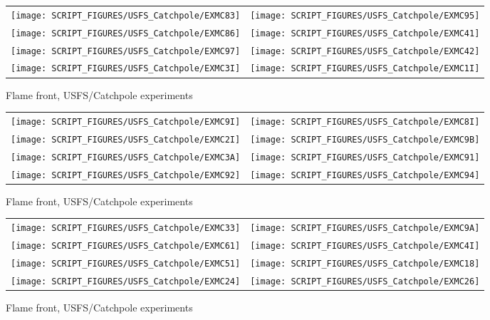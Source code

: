 \begin{figure}[p]
\begin{tabular*}{\textwidth}{l@{\extracolsep{\fill}}r}
\texttt{[image: SCRIPT\_FIGURES/USFS\_Catchpole/EXMC83]} &
\texttt{[image: SCRIPT\_FIGURES/USFS\_Catchpole/EXMC95]} \\
\texttt{[image: SCRIPT\_FIGURES/USFS\_Catchpole/EXMC86]} &
\texttt{[image: SCRIPT\_FIGURES/USFS\_Catchpole/EXMC41]} \\
\texttt{[image: SCRIPT\_FIGURES/USFS\_Catchpole/EXMC97]} &
\texttt{[image: SCRIPT\_FIGURES/USFS\_Catchpole/EXMC42]} \\
\texttt{[image: SCRIPT\_FIGURES/USFS\_Catchpole/EXMC3I]} &
\texttt{[image: SCRIPT\_FIGURES/USFS\_Catchpole/EXMC1I]} \\
\end{tabular*}
\caption[Flame front, USFS/Catchpole experiments]{Flame front, USFS/Catchpole experiments}
\label{USFS_Catchpole_256}
\end{figure}

\begin{figure}[p]
\begin{tabular*}{\textwidth}{l@{\extracolsep{\fill}}r}
\texttt{[image: SCRIPT\_FIGURES/USFS\_Catchpole/EXMC9I]} &
\texttt{[image: SCRIPT\_FIGURES/USFS\_Catchpole/EXMC8I]} \\
\texttt{[image: SCRIPT\_FIGURES/USFS\_Catchpole/EXMC2I]} &
\texttt{[image: SCRIPT\_FIGURES/USFS\_Catchpole/EXMC9B]} \\
\texttt{[image: SCRIPT\_FIGURES/USFS\_Catchpole/EXMC3A]} &
\texttt{[image: SCRIPT\_FIGURES/USFS\_Catchpole/EXMC91]} \\
\texttt{[image: SCRIPT\_FIGURES/USFS\_Catchpole/EXMC92]} &
\texttt{[image: SCRIPT\_FIGURES/USFS\_Catchpole/EXMC94]} \\
\end{tabular*}
\caption[Flame front, USFS/Catchpole experiments]{Flame front, USFS/Catchpole experiments}
\label{USFS_Catchpole_264}
\end{figure}

\begin{figure}[p]
\begin{tabular*}{\textwidth}{l@{\extracolsep{\fill}}r}
\texttt{[image: SCRIPT\_FIGURES/USFS\_Catchpole/EXMC33]} &
\texttt{[image: SCRIPT\_FIGURES/USFS\_Catchpole/EXMC9A]} \\
\texttt{[image: SCRIPT\_FIGURES/USFS\_Catchpole/EXMC61]} &
\texttt{[image: SCRIPT\_FIGURES/USFS\_Catchpole/EXMC4I]} \\
\texttt{[image: SCRIPT\_FIGURES/USFS\_Catchpole/EXMC51]} &
\texttt{[image: SCRIPT\_FIGURES/USFS\_Catchpole/EXMC18]} \\
\texttt{[image: SCRIPT\_FIGURES/USFS\_Catchpole/EXMC24]} &
\texttt{[image: SCRIPT\_FIGURES/USFS\_Catchpole/EXMC26]} \\
\end{tabular*}
\caption[Flame front, USFS/Catchpole experiments]{Flame front, USFS/Catchpole experiments}
\label{USFS_Catchpole_272}
\end{figure}

